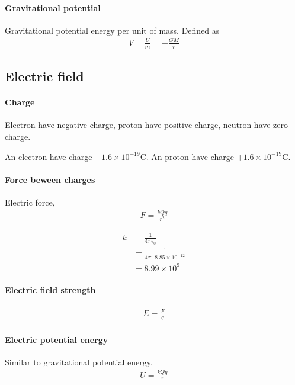         \paragraph{Gravitational potential}
            Gravitational potential energy per unit of mass. Defined as 
            \begin{align}
                V = \frac{U}{m} = - \frac{G M}{r}
            \end{align}

    \subsection{Electric field}
        \paragraph{Charge}
            Electron have negative charge, proton have positive charge, neutron have zero charge.

            An electron have charge $- 1.6 \times 10^{-19} \mathrm{C}$. An proton have charge $+ 1.6 \times 10^{-19} \mathrm{C}$.

        \paragraph{Force beween charges}
            Electric force,
            \begin{align}
                F = \frac{k Q q}{r^2}
            \end{align}

            \begin{align}
                k &= \frac{1}{4 \pi \epsilon_0} \\
                  &= \frac{1}{4 \pi \cdot 8.85 \times 10^{-12}} \\
                  &= 8.99 \times 10^9
            \end{align}

        \paragraph{Electric field strength}
            \begin{align}
                E = \frac{F}{q}
            \end{align}

        \paragraph{Electric potential energy}
            Similar to gravitational potential energy.
            \begin{align}
                U = \frac{k Q q}{r}
            \end{align}


